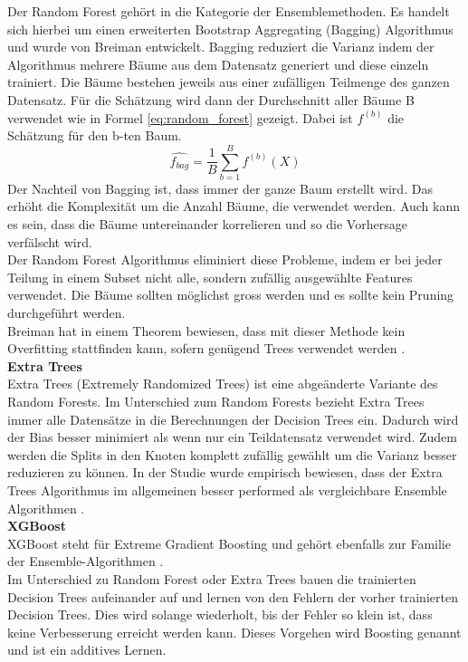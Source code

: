 Der Random Forest gehört in die Kategorie der Ensemblemethoden. Es handelt sich hierbei um einen erweiterten Bootstrap Aggregating (Bagging) Algorithmus und wurde von Breiman entwickelt. Bagging reduziert die Varianz indem der Algorithmus mehrere Bäume aus dem Datensatz generiert und diese einzeln trainiert.  Die Bäume bestehen jeweils aus einer zufälligen Teilmenge des ganzen Datensatz. Für die Schätzung wird dann der Durchschnitt aller Bäume B verwendet wie in Formel \eqref{eq:random_forest} gezeigt. Dabei ist $f^{(b)}$ die Schätzung für den b-ten Baum.
%
\begin{equation}
\label{eq:random_forest}
\hat{f_{bag}} = \frac{1}{B} \sum_{b=1}^{B} f^{(b)} (X)
\end{equation}
%
\newline
Der Nachteil von Bagging ist, dass immer der ganze Baum erstellt wird. Das erhöht die Komplexität um die Anzahl Bäume, die verwendet werden. Auch kann es sein, dass die Bäume untereinander korrelieren und so die Vorhersage verfälscht wird.\\
Der Random Forest Algorithmus eliminiert diese Probleme, indem er bei jeder Teilung in einem Subset nicht alle, sondern zufällig ausgewählte Features verwendet.
Die Bäume sollten möglichst gross werden und es sollte kein Pruning durchgeführt werden.\\
Breiman hat in einem Theorem bewiesen, dass mit dieser Methode kein Overfitting stattfinden kann, sofern genügend Trees verwendet werden \cite{random_forest, random_forest_1}.\\[2ex]
%
\textbf{Extra Trees}\\
Extra Trees (Extremely Randomized Trees) ist eine abgeänderte Variante des Random Forests. Im Unterschied zum Random Forests bezieht Extra Trees immer alle Datensätze in die Berechnungen der Decision Trees ein. Dadurch wird der Bias besser minimiert als wenn nur ein Teildatensatz verwendet wird. Zudem werden die Splits in den Knoten komplett zufällig gewählt um die Varianz besser reduzieren zu können. In der Studie wurde empirisch bewiesen, dass der Extra Trees Algorithmus im allgemeinen besser performed als vergleichbare Ensemble Algorithmen \cite{extrem_forest}.\\[2ex]
%
\textbf{XGBoost}\\
XGBoost steht für Extreme Gradient Boosting und gehört ebenfalls zur Familie der Ensemble-Algorithmen \cite{xgboost}.\\
Im Unterschied zu Random Forest oder Extra Trees bauen die trainierten Decision Trees aufeinander auf und lernen von den Fehlern der vorher trainierten Decision Trees. Dies wird solange wiederholt, bis der Fehler so klein ist, dass keine Verbesserung erreicht werden kann. Dieses Vorgehen wird Boosting genannt und ist ein additives Lernen.\\
